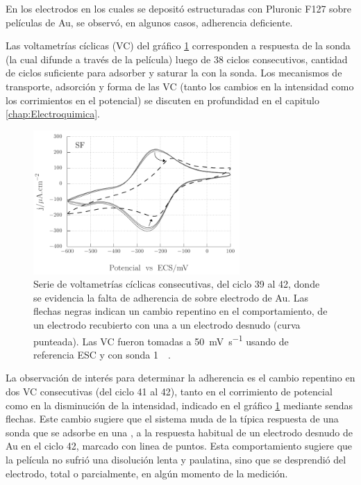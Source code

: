 			En los electrodos en los cuales se depositó \pdm\space estructuradas con Pluronic F127 sobre películas de Au, se observó, en algunos casos, adherencia deficiente. 
			
			Las voltametrías cíclicas (VC) del gráfico \ref{fig:adherencia_F127} corresponden a respuesta de la sonda \aminorutenio (la cual difunde a través de la película) luego de 38 ciclos consecutivos, cantidad de ciclos suficiente para adsorber y saturar la \pdm\space con la sonda. Los mecanismos de transporte, adsorción y forma de las VC (tanto los cambios en la intensidad como los corrimientos en el potencial) se discuten en profundidad en el capitulo \ref{chap:Electroquimica}. 
			
				\begin{figure}[bh!]
				 	   	    \begin{center} 
				        	\includegraphics[width=0.70\textwidth]{Graficos/Adherencia_F127.pdf}
				       		\caption[Adherencia de \pdmF \space sobre una película delgada de Au.]{Serie de voltametrías cíclicas consecutivas, del ciclo 39 al 42, donde se evidencia la falta de adherencia de \pdmF\space sobre electrodo de Au. Las flechas negras indican un cambio repentino en el comportamiento, de un electrodo recubierto con una \pdm\space a un electrodo desnudo (curva punteada). Las VC fueron tomadas a \SI{50}{\milli\volt.\second^{-1}} usando de referencia ESC y con sonda \ru\space \SI{1}{\milli\Molar}.}
				         	\label{fig:adherencia_F127}
				     		\end{center}
				     		\end{figure}

			La observación de interés para determinar la adherencia es el cambio repentino en dos VC consecutivas (del ciclo 41 al 42), tanto en el corrimiento de potencial como en la disminución de la intensidad, indicado en el gráfico \ref{fig:adherencia_F127} mediante sendas flechas. Este cambio sugiere que el sistema muda de la típica respuesta de una sonda que se adsorbe en una \pdm, a la respuesta habitual de un electrodo desnudo de Au en el ciclo 42, marcado con linea de puntos. Esta comportamiento sugiere que la película no sufrió una disolución lenta y paulatina, sino que se desprendió del electrodo, total o parcialmente, en algún momento de la medición.	     		

